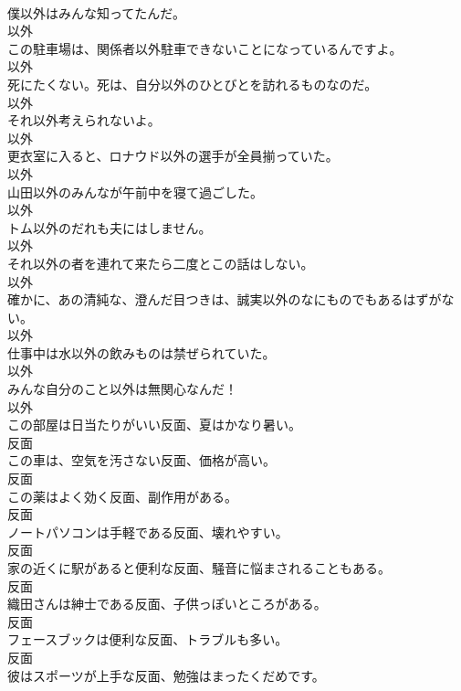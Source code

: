 \documentclass[8pt]{extreport}
\begin{document}
\begin{CJK}{UTF8}{min}
\\	僕以外はみんな知ってたんだ。	
\\	以外	
\\	この駐車場は、関係者以外駐車できないことになっているんですよ。	
\\	以外	
\\	死にたくない。死は、自分以外のひとびとを訪れるものなのだ。	
\\	以外	
\\	それ以外考えられないよ。	
\\	以外	
\\	更衣室に入ると、ロナウド以外の選手が全員揃っていた。	
\\	以外	
\\	山田以外のみんなが午前中を寝て過ごした。	
\\	以外	
\\	トム以外のだれも夫にはしません。	
\\	以外	
\\	それ以外の者を連れて来たら二度とこの話はしない。	
\\	以外	
\\	確かに、あの清純な、澄んだ目つきは、誠実以外のなにものでもあるはずがない。	
\\	以外	
\\	仕事中は水以外の飲みものは禁ぜられていた。	
\\	以外	
\\	みんな自分のこと以外は無関心なんだ！	
\\	以外	
\\	この部屋は日当たりがいい反面、夏はかなり暑い。	
\\	反面	
\\	この車は、空気を汚さない反面、価格が高い。	
\\	反面	
\\	この薬はよく効く反面、副作用がある。	
\\	反面	
\\	ノートパソコンは手軽である反面、壊れやすい。	
\\	反面	
\\	家の近くに駅があると便利な反面、騒音に悩まされることもある。	
\\	反面	
\\	織田さんは紳士である反面、子供っぽいところがある。	
\\	反面	
\\	フェースブックは便利な反面、トラブルも多い。	
\\	反面	
\\	彼はスポーツが上手な反面、勉強はまったくだめです。	

\end{CJK}
\end{document}
